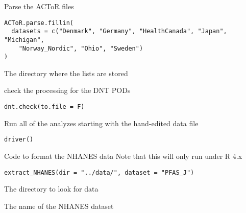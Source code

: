 \documentclass[a4paper]{book}
\begin{document}
%
\begin{Description}\relax
Parse the ACToR files
\end{Description}
%
\begin{Usage}
\begin{verbatim}
ACToR.parse.fillin(
  datasets = c("Denmark", "Germany", "HealthCanada", "Japan", "Michigan",
    "Norway_Nordic", "Ohio", "Sweden")
)
\end{verbatim}
\end{Usage}
%
\begin{Arguments}
\begin{ldescription}
\item[\code{dir}] The directory where the lists are stored
\end{ldescription}
\end{Arguments}
%
\begin{Description}\relax
check the processing for the DNT PODs
\end{Description}
%
\begin{Usage}
\begin{verbatim}
dnt.check(to.file = F)
\end{verbatim}
\end{Usage}
%
\begin{Description}\relax
Run all of the analyzes starting with the hand-edited data file
\end{Description}
%
\begin{Usage}
\begin{verbatim}
driver()
\end{verbatim}
\end{Usage}
%
\begin{Description}\relax
Code to format the NHANES data
Note that this will only run under R 4.x
\end{Description}
%
\begin{Usage}
\begin{verbatim}
extract_NHANES(dir = "../data/", dataset = "PFAS_J")
\end{verbatim}
\end{Usage}
%
\begin{Arguments}
\begin{ldescription}
\item[\code{dir}] The directory to look for data

\item[\code{dataset}] The name of the NHANES dataset
\end{ldescription}
\end{Arguments}
\end{document}
